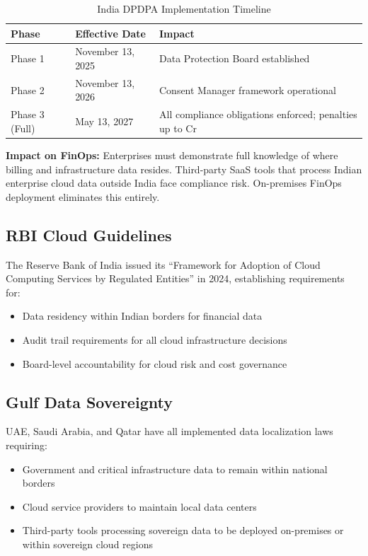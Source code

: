 \documentclass[a4paper,11pt]{article}
\begin{document}
\begin{table}[H]
\centering
\begin{tabularx}{\textwidth}{llX}
\toprule
\textbf{Phase} & \textbf{Effective Date} & \textbf{Impact} \\
\midrule
Phase 1 & November 13, 2025 & Data Protection Board established \\
Phase 2 & November 13, 2026 & Consent Manager framework operational \\
Phase 3 (Full) & May 13, 2027 & All compliance obligations enforced; penalties up to \rupee 250 Cr \\
\bottomrule
\end{tabularx}
\caption{India DPDPA Implementation Timeline}
\end{table}

\textbf{Impact on FinOps:} Enterprises must demonstrate full knowledge of where billing and infrastructure data resides. Third-party SaaS tools that process Indian enterprise cloud data outside India face compliance risk. On-premises FinOps deployment eliminates this entirely.

\subsection{RBI Cloud Guidelines}

The Reserve Bank of India issued its ``Framework for Adoption of Cloud Computing Services by Regulated Entities'' in 2024, establishing requirements for:
\begin{itemize}[itemsep=1mm]
    \item Data residency within Indian borders for financial data
    \item Audit trail requirements for all cloud infrastructure decisions
    \item Board-level accountability for cloud risk and cost governance
\end{itemize}

\subsection{Gulf Data Sovereignty}

UAE, Saudi Arabia, and Qatar have all implemented data localization laws requiring:
\begin{itemize}[itemsep=1mm]
    \item Government and critical infrastructure data to remain within national borders
    \item Cloud service providers to maintain local data centers
    \item Third-party tools processing sovereign data to be deployed on-premises or within sovereign cloud regions
\end{itemize}
\end{document}
